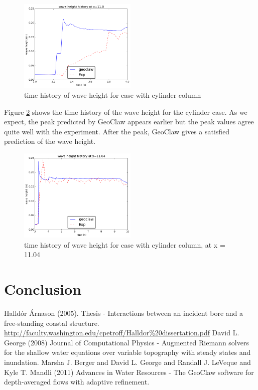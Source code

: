 \documentclass[11pt]{article}
\begin{document}
\begin{figure}[h!]
    \centering
    \includegraphics[width=0.5\textwidth]{./plots/waveheight_cylinder_x11}
    \caption{time history of wave height for case with cylinder column}
    \label{fig:waveheight_cylinder_x=11.0}
\end{figure}
\par
Figure \ref{fig:waveheight_cylinder_x=11.04} shows the time history of the wave height for the cylinder case. As we expect, the peak predicted by GeoClaw appears earlier but the peak values agree quite well with the experiment.
After the peak, GeoClaw gives a satisfied prediction of the wave height.
\begin{figure}[h!]
    \centering
    \includegraphics[width=0.5\textwidth]{./plots/waveheight_cylinder_x1104_largerTimeScale}
    \caption{time history of wave height for case with cylinder column, at x = 11.04}
    \label{fig:waveheight_cylinder_x=11.04}
\end{figure}

\section{Conclusion}\label{Sec:Conclusion}
{\footnotesize
\begin{thebibliography}{100}
 Halld\'or \'Arnason  (2005). Thesis - Interactions between an incident bore and a free-standing coastal structure. \url{http://faculty.washington.edu/cpetroff/Halldor%20dissertation.pdf}
 David L. George (2008) Journal of Computational Physics - Augmented Riemann solvers for the shallow water equations over variable topography with steady states and inundation.
 Marsha J. Berger and David L. George and Randall J. LeVeque and Kyle T. Mandli (2011) Advances in Water Resources - The GeoClaw software for depth-averaged flows with adaptive refinement.
\end{thebibliography}
}
\end{document}
